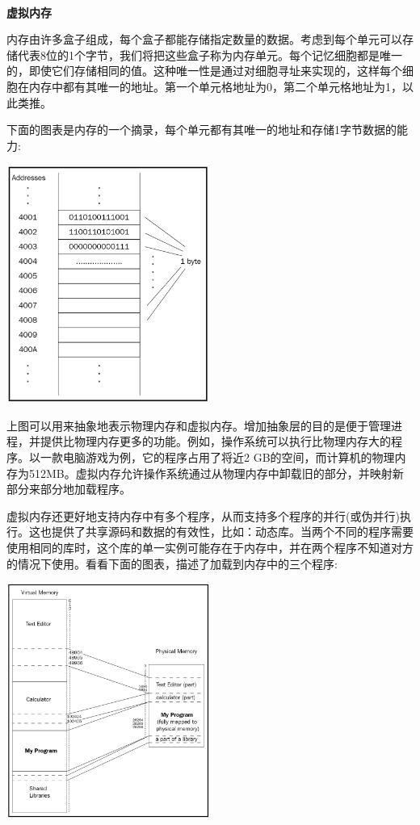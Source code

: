 \noindent\textbf{}\ \par
\textbf{虚拟内存} \ \par
内存由许多盒子组成，每个盒子都能存储指定数量的数据。考虑到每个单元可以存储代表8位的1个字节，我们将把这些盒子称为内存单元。每个记忆细胞都是唯一的，即使它们存储相同的值。这种唯一性是通过对细胞寻址来实现的，这样每个细胞在内存中都有其唯一的地址。第一个单元格地址为0，第二个单元格地址为1，以此类推。\par
下面的图表是内存的一个摘录，每个单元都有其唯一的地址和存储1字节数据的能力:\par

\begin{center}
	\includegraphics[width=0.5\textwidth]{content/Section-1/Chapter-2/6}
\end{center}

上图可以用来抽象地表示物理内存和虚拟内存。增加抽象层的目的是便于管理进程，并提供比物理内存更多的功能。例如，操作系统可以执行比物理内存大的程序。以一款电脑游戏为例，它的程序占用了将近2 GB的空间，而计算机的物理内存为512MB。虚拟内存允许操作系统通过从物理内存中卸载旧的部分，并映射新部分来部分地加载程序。 \par
虚拟内存还更好地支持内存中有多个程序，从而支持多个程序的并行(或伪并行)执行。这也提供了共享源码和数据的有效性，比如：动态库。当两个不同的程序需要使用相同的库时，这个库的单一实例可能存在于内存中，并在两个程序不知道对方的情况下使用。看看下面的图表，描述了加载到内存中的三个程序: \par

\begin{center}
	\includegraphics[width=0.5\textwidth]{content/Section-1/Chapter-2/7}
\end{center}

